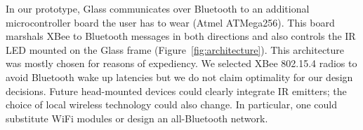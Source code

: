 In our prototype, Glass communicates over Bluetooth to an additional microcontroller board the user has to wear (Atmel ATMega256). This board marshals XBee to Bluetooth messages in both directions and also controls the IR LED mounted on the Glass frame (Figure~\ref{fig:architecture}). This architecture was mostly chosen for reasons of expediency. We selected XBee 802.15.4 radios to avoid Bluetooth  wake up latencies but we do not claim optimality for our design decisions. Future head-mounted devices could clearly integrate IR emitters; the choice of local wireless technology could also change. In particular, one could substitute WiFi modules or design an all-Bluetooth network.


